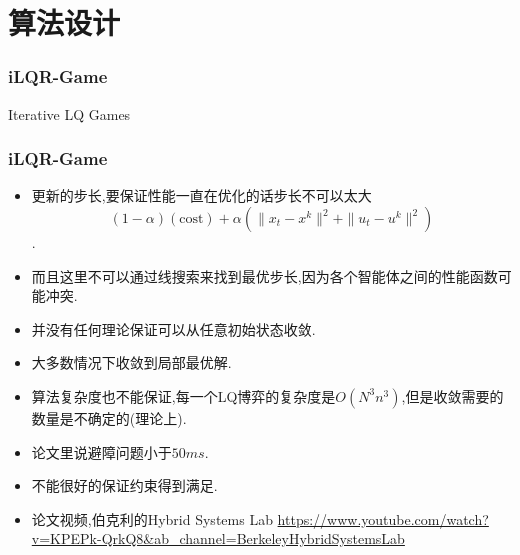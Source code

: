 \documentclass[UTF8, aspectratio=169, 9pt]{ctexbeamer}
\begin{document}
\section{算法设计}
\begin{frame}
\frametitle{iLQR-Game}

\begin{algorithm}[H]
\caption{Iterative LQ Games}%
\LinesNumbered %

\end{algorithm}

\end{frame}


\begin{frame}
\frametitle{iLQR-Game}
\begin{itemize}
  \item 更新的步长,要保证性能一直在优化的话步长不可以太大
  $$
  (1-\alpha)(\text{cost})+\alpha(\| x_t - x^k \|^2 + \| u_t - u^k \|^2)
  $$.
  \item 而且这里不可以通过线搜索来找到最优步长,因为各个智能体之间的性能函数可能冲突.
  \item 并没有任何理论保证可以从任意初始状态收敛.
  \item 大多数情况下收敛到局部最优解.
  \item 算法复杂度也不能保证,每一个LQ博弈的复杂度是$O(N^3 n^3)$,但是收敛需要的数量是不确定的(理论上).
  \item 论文里说避障问题小于$50ms$.
  \item 不能很好的保证约束得到满足.
  \item 论文视频,伯克利的Hybrid Systems Lab \url{https://www.youtube.com/watch?v=KPEPk-QrkQ8&ab_channel=BerkeleyHybridSystemsLab}
\end{itemize}
\end{frame}
\end{document}
